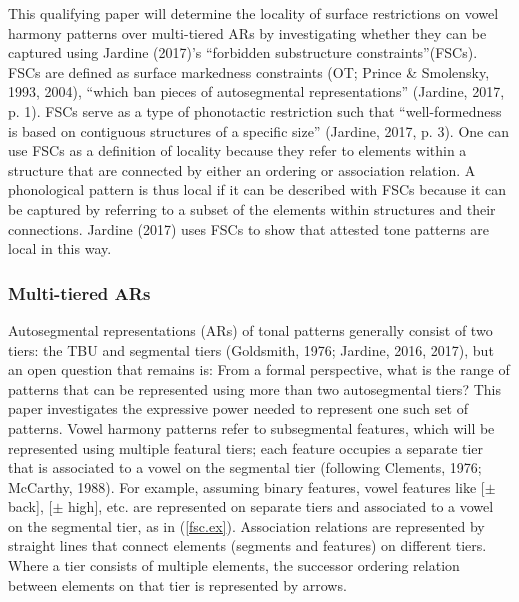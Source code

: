 \documentclass[,doc,floatsintext]{apa6}
\theoremstyle{definition}
\theoremstyle{definition}
\theoremstyle{definition}
\theoremstyle{remark}
\begin{document}
This qualifying paper will determine the locality of surface
restrictions on vowel harmony patterns over multi-tiered ARs by
investigating whether they can be captured using Jardine (2017)'s
\enquote{forbidden substructure constraints}(FSCs). FSCs are defined as
surface markedness constraints (OT; Prince \& Smolensky, 1993, 2004),
\enquote{which ban pieces of autosegmental representations} (Jardine,
2017, p. 1). FSCs serve as a type of phonotactic restriction such that
\enquote{well-formedness is based on contiguous structures of a specific
size} (Jardine, 2017, p. 3). One can use FSCs as a definition of
locality because they refer to elements within a structure that are
connected by either an ordering or association relation. A phonological
pattern is thus local if it can be described with FSCs because it can be
captured by referring to a subset of the elements within structures and
their connections. Jardine (2017) uses FSCs to show that attested tone
patterns are local in this way.

\subsubsection{Multi-tiered ARs}\label{multi-tiered-ars}

Autosegmental representations (ARs) of tonal patterns generally consist
of two tiers: the TBU and segmental tiers (Goldsmith, 1976; Jardine,
2016, 2017), but an open question that remains is: From a formal
perspective, what is the range of patterns that can be represented using
more than two autosegmental tiers? This paper investigates the
expressive power needed to represent one such set of patterns. Vowel
harmony patterns refer to subsegmental features, which will be
represented using multiple featural tiers; each feature occupies a
separate tier that is associated to a vowel on the segmental tier
(following Clements, 1976; McCarthy, 1988). For example, assuming binary
features, vowel features like {[}\(\pm\) back{]}, {[}\(\pm\) high{]},
etc. are represented on separate tiers and associated to a vowel on the
segmental tier, as in (\ref{fsc.ex}). Association relations are
represented by straight lines that connect elements (segments and
features) on different tiers. Where a tier consists of multiple
elements, the successor ordering relation between elements on that tier
is represented by arrows.

\begin{exe}
\ex \label{fsc.ex}
\end{exe}
\end{document}
